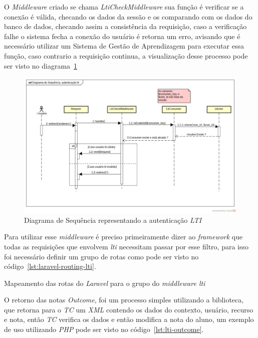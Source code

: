O \textit{Middleware} criado se chama \textit{LtiCheckMiddleware} sua função é verificar se a conexão é válida, checando os dados da sessão e os comparando com os dados do banco de dados, checando assim a consistência da requisição, caso a verificação falhe o sistema fecha a conexão do usuário é retorna um erro, avisando que é necessário utilizar um Sistema de Gestão de Aprendizagem para executar essa função, caso contrario a requisição continua, a visualização desse processo pode ser visto no diagrama~\ref{fig:diagrama-sequencia-autenticacao-lti}

\begin{figure}[htbp]
    \centering
    \includegraphics[keepaspectratio=true,scale=0.45]{figuras/diagrama_sequencia_autenticacao_lti.png}
    \caption{Diagrama de Sequência representando a autenticação \textit{LTI}}
    \label{fig:diagrama-sequencia-autenticacao-lti}
\end{figure}

Para utilizar esse \textit{middleware} é preciso primeiramente dizer ao \textit{framework} que todas as requisições que envolvem \textit{lti} necessitam passar por esse filtro, para isso foi necessário definir um grupo de rotas como pode ser visto no código~\ref{lst:laravel-routing-lti}.

\begin{listing}
    \caption{Mapeamento das rotas do \textit{Laravel} para o grupo do \textit{middleware lti}}
    \label{lst:laravel-routing-lti}
\end{listing}

O retorno das notas \textit{Outcome}, foi um processo simples utilizando a biblioteca, que retorna para o \textit{TC} um \textit{XML} contendo os dados do contexto, usuário, recurso e nota, então \textit{TC} verifica os dados e então modifica a nota do aluno, um exemplo de uso utilizando \textit{PHP} pode ser visto no código~\ref{lst:lti-outcome}.

